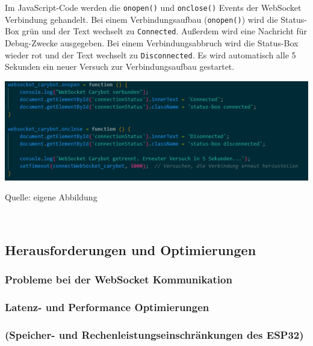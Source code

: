 \documentclass[ngerman,12pt,a4paper]{article}
\begin{document}
	Im JavaScript-Code werden die \texttt{onopen()} und \texttt{onclose()} Events der WebSocket Verbindung gehandelt. Bei einem Verbindungsaufbau (\texttt{onopen()}) wird die Status-Box grün und der Text wechselt zu \texttt{Connected}. Außerdem wird eine Nachricht für Debug-Zwecke ausgegeben. Bei einem Verbindungsabbruch wird die Status-Box wieder rot und der Text wechselt zu \texttt{Disconnected}. Es wird automatisch alle 5 Sekunden ein neuer Versuch zur Verbindungsaufbau gestartet.
	\begin{center}
		\begin{minipage}[t]{0.95\textwidth}
			\includegraphics[scale=0.9]{Pictures/status-js}
			\label{fig:status-js}
			\vspace{-10pt}
			\begin{center}
				\par\small Quelle: eigene Abbildung 
			\end{center}
		\end{minipage} \\[0.75cm]
	\end{center}
			
		\subsection{Herausforderungen und Optimierungen}
		
			\subsubsection{Probleme bei der WebSocket Kommunikation}
			
			\subsubsection{Latenz- und Performance Optimierungen}
			
			\subsubsection{(Speicher- und Rechenleistungseinschränkungen des ESP32)}
		\newpage
					
\end{document}
